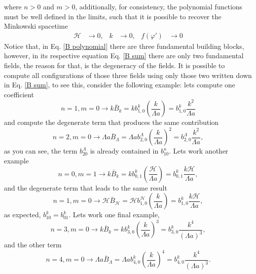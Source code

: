 \documentclass{article}
\begin{document}
where $n>0$ and $m>0$, additionally, for consistency, the polynomial functions must be well defined
in the limits, such that it is possible to recover the Minkowski spacetime
\begin{align}
    \mathcal{H} &\to 0, & k &\to 0, & f(\varphi') & \to 0
\end{align}
Notice that, in Eq. \eqref{B polynomial} there are three fundamental building blocks, however, in 
its respective equation Eq. \eqref{B sum} there are only two fundamental fields, the reason for that,
is the degeneracy of the fields. It is possible to compute all configurations of those three fields
using only those two written down in Eq. \eqref{B sum}, to see this, consider the following example:
lets compute one coefficient 
\begin{equation}
    n = 1, m = 0 \to k\bar{B}_{k} = k b^{k}_{1,0}\left(\frac{k}{\Lambda a}\right) 
    = b^{k}_{1,0}\frac{k^2}{\Lambda a}
\end{equation}
and compute the degenerate term that produces the same contribution
\begin{equation}
    n = 2, m = 0 \to \Lambda a \bar{B}_{\Lambda} = \Lambda a b^{\Lambda}_{2,0}\left(\frac{k}{\Lambda a}\right)^2
    = b^{\Lambda}_{2,0} \frac{k^2}{\Lambda a},
\end{equation}
as you can see, the term $b^{\Lambda}_{20}$ is already contained in $b^{\kappa}_{10}$. Lets work 
another example
\begin{equation}
    n = 0, m = 1 \to k\bar{B}_{k} = k b^{k}_{0,1}\left(\frac{\mathcal{H}}{\Lambda a}\right) 
    = b^{k}_{0,1}\frac{k\mathcal{H}}{\Lambda a},
\end{equation}
and the degenerate term that leads to the same result
\begin{equation}
    n = 1, m = 0 \to \mathcal{H}\bar{B}_{\mathcal{H}} = \mathcal{H} b^{\mathcal{H}}_{1,0}\left(\frac{k}{\Lambda a}\right)
    = b^{k}_{1,0}\frac{k\mathcal{H}}{\Lambda a},
\end{equation}
as expected, $b^{k}_{10} = b^{k}_{01}$. Lets work one final example,
\begin{equation}
    n = 3, m = 0 \to k\bar{B}_{k} = k b^{k}_{3,0}\left(\frac{k}{\Lambda a}\right)^3 
    = b^{k}_{3,0}\frac{k^4}{\left(\Lambda a\right)^3},
\end{equation}
and the other term
\begin{equation}
    n = 4, m = 0 \to \Lambda a\bar{B}_{\Lambda} = \Lambda a b^{k}_{4,0}\left(\frac{k}{\Lambda a}\right)^4 
    = b^{k}_{4,0}\frac{k^4}{\left(\Lambda a\right)^3}.
\end{equation}
\end{document}
